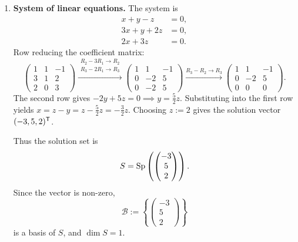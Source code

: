 \begin{exercisesolution*}
\label{sol:bases_dimensions_various_spaces}
\begin{enumerate}[label=\textbf{(\alph*)}]
    \item \textbf{System of linear equations.} The system is
    \[
        \begin{aligned}
            x + y - z &= 0, \\
            3x + y + 2z &= 0, \\
            2x + 3z &= 0.
        \end{aligned}
    \]
    Row reducing the coefficient matrix:
    \[
        \begin{pmatrix}
            1 & 1 & -1 \\
            3 & 1 & 2 \\
            2 & 0 & 3
        \end{pmatrix}
        \xrightarrow{\substack{R_2 - 3R_1 \to R_2 \\ R_3 - 2R_1 \to R_3}}
        \begin{pmatrix}
            1 & 1 & -1 \\
            0 & -2 & 5 \\
            0 & -2 & 5
        \end{pmatrix}
        \xrightarrow{R_3 - R_2 \to R_3}
        \begin{pmatrix}
            1 & 1 & -1 \\
            0 & -2 & 5 \\
            0 & 0 & 0
        \end{pmatrix}.
    \]
    The second row gives $-2y + 5z = 0 \implies y = \frac{5}{2}z$. Substituting into the first row yields $x = z - y = z - \frac{5}{2}z = -\frac{3}{2}z$. Choosing $z := 2$ gives the solution vector $(-3, 5, 2)^{\mathsf{T}}$.
    
    Thus the solution set is
    \[
    S = \operatorname{Sp}\left( \begin{pmatrix} -3 \\ 5 \\ 2 \end{pmatrix} \right).
    \]
    Since the vector is non-zero,
    \[
    \mathcal{B} := \left\{ \begin{pmatrix} -3 \\ 5 \\ 2 \end{pmatrix} \right\}
    \]
    is a basis of $S$, and $\dim S = 1$.


\end{enumerate}
\end{exercisesolution*}
